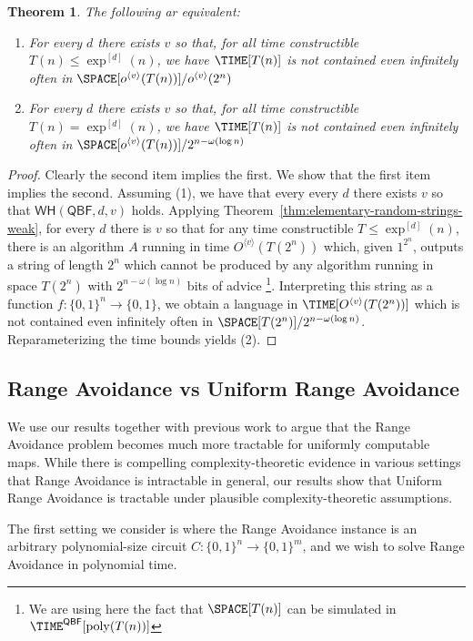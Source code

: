 \documentclass[11pt]{article}
\newtheorem{theorem}{Theorem}
\newcommand{\B}{\{0,1\}}
\newcommand{\od}[1]{O^{\langle #1 \rangle}}
\newcommand{\WH}{\mathsf{WH}}
\renewcommand{\poly}{\mathrm{poly}}
\begin{document}
\begin{theorem} The following ar equivalent:
\begin{enumerate}
    \item For every $d$ there exists $v$ so that, for all time constructible $T (n) \leq \exp^{[d]}(n)$, we have $\TIME[T(n)]$ is not contained even infinitely often in $\SPACE[o^{\langle v\rangle }(T(n))]/o^{\langle v \rangle}(2^n)$ 
    \item For every $d$ there exists $v$ so that, for all time constructible $T (n) = \exp^{[d]}(n)$, we have $\TIME[T(n)]$ is not contained even infinitely often in $\SPACE[o^{\langle v\rangle }(T(n))]/2^{n - \omega(\log n)}$ 
\end{enumerate}
\end{theorem}
\begin{proof}
Clearly the second item implies the first. We show that the first item implies the second. Assuming (1), we have that every every $d$ there exists $v$ so that $\WH(\mathsf{QBF}, d, v)$ holds. Applying Theorem~\ref{thm:elementary-random-strings-weak}, for every $d$ there is $v$ so that for any time constructible $T\leq \exp^{[d]}(n)$, there is an algorithm $A$ running in time $\od{v}(T(2^n))$ which, given $1^{2^n}$, outputs a string of length $2^n$ which cannot be produced by any algorithm running in space $T(2^n)$ with $2^{n - \omega(\log n)}$ bits of advice \footnote{We are using here the fact that $\SPACE[T(n)]$ can be simulated in $\TIME^{\mathsf{QBF}}[\poly(T(n))]$}. Interpreting this string as a function $f: \B^n \to \B$, we obtain a language in $\TIME[\od{v}(T(2^n))]$ which is not contained even infinitely often in $\SPACE[T(2^n)]/2^{n - \omega(\log n)}$. Reparameterizing the time bounds yields (2).
\end{proof}
\subsection{Range Avoidance vs Uniform Range Avoidance}\label{subsec:uniform-vs-nonuniform}


We use our results together with previous work to argue that the Range Avoidance problem becomes much more tractable for uniformly computable maps. While there is compelling complexity-theoretic evidence in various settings that Range Avoidance is intractable in general, our results show that Uniform Range Avoidance is tractable under plausible complexity-theoretic assumptions.

The first setting we consider is where the Range Avoidance instance is an arbitrary polynomial-size circuit $C: \B^n \to \B^m$, and we wish to solve Range Avoidance in polynomial time.
\end{document}
